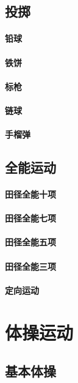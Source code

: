 \documentclass[UTF8]{../../ApplicationUniverse}
\begin{document}
\section{投掷}
    \subsubsection{铅球}
    \subsubsection{铁饼}
    \subsubsection{标枪}
    \subsubsection{链球}
    \subsubsection{手榴弹}
\section{全能运动}
    \subsubsection{田径全能十项}
    \subsubsection{田径全能七项}
    \subsubsection{田径全能五项}
    \subsubsection{田径全能三项}
\subsubsection{定向运动}






\chapter{体操运动}
\section{基本体操}
\end{document}
